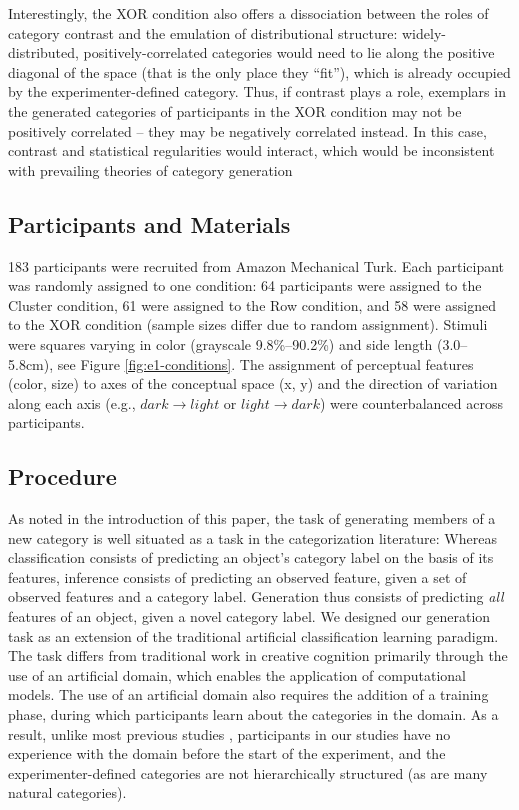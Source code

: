 \documentclass[12pt]{article}
\begin{document}
\begin{flushleft}
Interestingly, the XOR condition also offers a dissociation between the roles of
category contrast and the emulation of distributional structure:
widely-distributed, positively-correlated categories would need to lie along the
positive diagonal of the space (that is the only place they ``fit''), which is
already occupied by the experimenter-defined category. Thus, if contrast plays a
role, exemplars in the generated categories of participants in the XOR condition
may not be positively correlated -- they may be negatively correlated instead.
In this case, contrast and statistical regularities would interact, which would
be inconsistent with prevailing theories of category generation
\citep{jern2013probabilistic}


\subsection{Participants and Materials}

183 participants were recruited from Amazon Mechanical Turk. Each participant
was randomly assigned to one condition: 64 participants were assigned to the
Cluster condition, 61 were assigned to the Row condition, and 58 were assigned
to the XOR condition (sample sizes differ due to random assignment). Stimuli
were squares varying in color (grayscale 9.8\%--90.2\%) and side length
(3.0--5.8cm), see Figure \ref{fig:e1-conditions}. The assignment of perceptual
features (color, size) to axes of the conceptual space (x, y)  and the
direction of variation along each axis (e.g., $dark \rightarrow light$ or $light
\rightarrow dark$) were counterbalanced across participants.

\subsection{Procedure}

As noted in the introduction of this paper, the task of generating members of a
new category is well situated as a task in the categorization
literature: Whereas classification consists of predicting an object's category
label on the basis of its features, inference consists of predicting an observed
feature, given a set of observed features and a category label. Generation thus
consists of predicting {\em all} features of an object, given a novel category
label. We designed our generation task as an
extension of the traditional artificial classification learning paradigm. The
task differs from traditional work in creative cognition primarily through the
use of an artificial domain, which enables the application of computational
models. The use of an artificial domain also requires the addition of a training
phase, during which participants learn about the categories in the domain. As a
result, unlike most previous studies \citep[e.g.,][]{ward1994structured},
participants in our studies have no experience with the domain before the start
of the experiment, and the experimenter-defined categories are not
hierarchically structured (as are many natural categories).


\end{flushleft}
\end{document}
